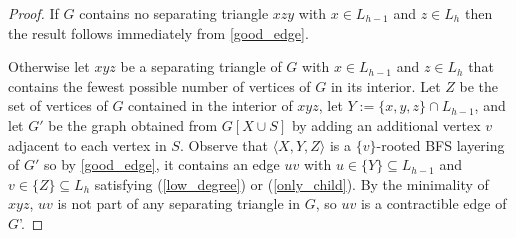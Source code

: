 \documentclass{patmorin}
\newcommand{\Rho}{\mathrm{P}}
\begin{document}
\begin{proof}
  If $G$ contains no separating triangle $xzy$ with $x\in L_{h-1}$ and $z\in L_h$ then the result follows immediately from \cref{good_edge}.

  Otherwise let $xyz$ be a separating triangle of $G$ with $x\in L_{h-1}$ and $z\in L_h$ that contains the fewest possible number of vertices of $G$ in its interior. Let $Z$ be the set of vertices of $G$ contained in the interior of $xyz$, let $Y:=\{x,y,z\}\cap L_{h-1}$, and let $G'$ be the graph obtained from $G[X\cup S]$ by adding an additional vertex $v$ adjacent to each vertex in $S$.  Observe that $\langle X,Y,Z\rangle$ is a $\{v\}$-rooted BFS layering of $G'$ so by \cref{good_edge}, it contains an edge $uv$ with $u\in\{Y\}\subseteq L_{h-1}$ and $v\in\{Z\}\subseteq L_h$ satisfying (\ref{low_degree}) or (\ref{only_child}). By the minimality of $xyz$, $uv$ is not part of any separating triangle in $G$, so $uv$ is a contractible edge of $G$'.
\end{proof}

%
\end{document}
